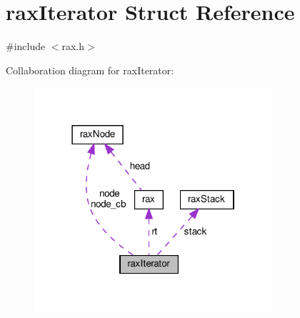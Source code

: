 \hypertarget{structrax_iterator}{}\section{rax\+Iterator Struct Reference}
\label{structrax_iterator}


{\ttfamily \#include $<$rax.\+h$>$}



Collaboration diagram for rax\+Iterator\+:
\nopagebreak
\begin{figure}[H]
\begin{center}
\leavevmode
\includegraphics[width=250pt]{structrax_iterator__coll__graph}
\end{center}
\end{figure}
